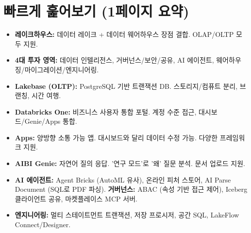 \documentclass[11pt,a4paper]{article}
\theoremstyle{definition}
\begin{document}
\newpage
\section*{빠르게 훑어보기 (1페이지 요약)}

\begin{tcolorbox}[title=\textbf{Databricks Lecture 14 핵심 요약}, colback=white, colframe=black!20!white, sharp corners, boxrule=0.5mm, breakable]

\begin{tcolorbox}[summary={플랫폼 진화: 레이크하우스와 데이터 인텔리전스}]
\begin{itemize}
    \item \textbf{레이크하우스:} 데이터 레이크 + 데이터 웨어하우스 장점 결합. OLAP/OLTP 모두 지원.
    \item \textbf{4대 투자 영역:} 데이터 인텔리전스, 거버넌스/보안/공유, AI 에이전트, 웨어하우징/마이그레이션/엔지니어링.
\end{itemize}
\end{tcolorbox}

\begin{tcolorbox}[summary={주요 신규 기능 (Public Preview/Upcoming)}]
\begin{itemize}
    \item \textbf{Lakebase (OLTP):} PostgreSQL 기반 트랜잭션 DB. 스토리지/컴퓨트 분리, 브랜칭, 시간 여행.
    \item \textbf{Databricks One:} 비즈니스 사용자 통합 포털. 계정 수준 접근, 대시보드/Genie/Apps 통합.
    \item \textbf{Apps:} 양방향 소통 가능 앱. 대시보드와 달리 데이터 수정 가능. 다양한 프레임워크 지원.
    \item \textbf{AIBI Genie:} 자연어 질의 응답. '연구 모드'로 '왜' 질문 분석. 문서 업로드 지원.
    \item \textbf{AI 에이전트:} Agent Bricks (AutoML 유사), 온라인 피처 스토어, AI Parse Document (SQL로 PDF 파싱).
    \textbf{거버넌스:} ABAC (속성 기반 접근 제어), Iceberg 클라이언트 공유, 마켓플레이스 MCP 서버.
    \item \textbf{엔지니어링:} 멀티 스테이트먼트 트랜잭션, 저장 프로시저, 공간 SQL, LakeFlow Connect/Designer.
\end{itemize}
\end{tcolorbox}


\end{tcolorbox}
\end{document}
